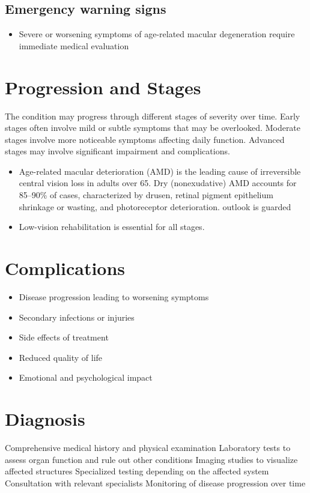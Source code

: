 \subsection{Emergency warning signs}
\begin{itemize}[noitemsep]
  \item Severe or worsening symptoms of age-related macular degeneration require immediate medical evaluation
\end{itemize}
\section{Progression and Stages}
The condition may progress through different stages of severity over time. Early stages often involve mild or subtle symptoms that may be overlooked. Moderate stages involve more noticeable symptoms affecting daily function. Advanced stages may involve significant impairment and complications.

\begin{itemize}[noitemsep]
  \item Age-related macular deterioration (AMD) is the leading cause of irreversible central vision loss in adults over 65. Dry (nonexudative) AMD accounts for 85--90\% of cases, characterized by drusen, retinal pigment epithelium shrinkage or wasting, and photoreceptor deterioration. outlook is guarded
  \item Low-vision rehabilitation is essential for all stages.
\end{itemize}
\section{Complications}
\begin{itemize}[noitemsep]
  \item Disease progression leading to worsening symptoms
  \item Secondary infections or injuries
  \item Side effects of treatment
  \item Reduced quality of life
  \item Emotional and psychological impact
\end{itemize}
\section{Diagnosis}
Comprehensive medical history and physical examination Laboratory tests to assess organ function and rule out other conditions Imaging studies to visualize affected structures Specialized testing depending on the affected system Consultation with relevant specialists Monitoring of disease progression over time

